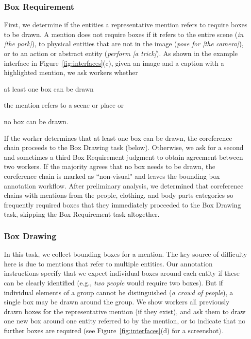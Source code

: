 \documentclass[twocolumn]{svjour3}
\begin{document}
\subsubsection{Box Requirement}
First, we determine if the entities a representative mention refers to require boxes to be drawn.  A mention does not require boxes if it refers to the entire scene (\textit{in [the park]}), to physical entities that are not in the image (\textit{pose for [the camera]}), or to an action or abstract entity (\textit{perform [a trick]}). As shown in the example interface in Figure~\ref{fig:interfaces}(c), given an image and a caption with a highlighted mention, we ask workers whether
\begin{inparaenum}[(1)]
	\item{at least one box can be drawn}
    \item{the mention refers to a scene or place or}
    \item{no box can be drawn.}
\end{inparaenum}


If the worker determines that at least one box can be drawn, the coreference chain proceeds to the Box Drawing task (below). Otherwise, we ask for a second and sometimes a third Box Requirement judgment to obtain agreement between two workers. If the majority agrees that no box needs to be drawn, the coreference chain is marked as ``non-visual" and leaves the bounding box annotation workflow. After preliminary analysis, we determined that coreference chains with mentions from the people, clothing, and body parts categories so frequently required boxes that they immediately proceeded to the Box Drawing task, skipping the Box Requirement task altogether.



\subsubsection{Box Drawing}
In this task, we collect bounding boxes for a mention. The key source of difficulty here is due to mentions that refer to multiple entities. Our annotation instructions specify that we expect individual boxes around each entity if these can be clearly identified (e.g., \textit{two people} would require two boxes). But if individual elements of a group cannot be distinguished (\textit{a crowd of people}), a single box may be drawn around the group. We show workers all previously drawn boxes for the representative mention (if they exist), and ask them to draw one new box around one entity referred to by the mention, or to indicate that no further boxes are required (see Figure~\ref{fig:interfaces}(d) for a screenshot). 
\end{document}
